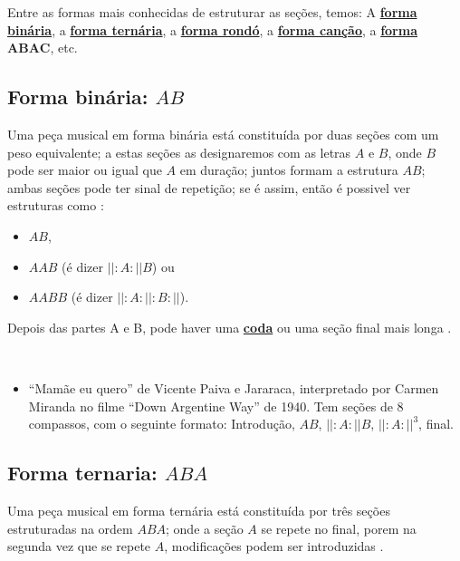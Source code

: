 Entre as formas mais conhecidas de estruturar as seções, temos:
A \hyperref[subsec:formabinaria]{\textbf{forma binária}}, 
a \hyperref[subsec:formaternaria]{\textbf{forma ternária}}, 
a \hyperref[subsec:formarondo]{\textbf{forma rondó}}, 
a \hyperref[subsec:formacancao]{\textbf{forma canção}}, 
a \hyperref[subsec:formaabac]{\textbf{forma $\mathbf{ABAC}$}}, 
etc.
 



\subsection{Forma binária: $AB$}
\label{subsec:formabinaria}
Uma peça musical em forma binária está constituída por duas seções 
com um peso equivalente; 
a estas seções as designaremos com as letras $A$ e $B$, 
onde $B$ pode ser maior ou igual que $A$ em duração; juntos
formam a estrutura $AB$;
ambas seções pode ter sinal de repetição; se é assim, então é possivel ver estruturas como 
\cite[pp. 71]{bennett1993elementos} \cite[pp. 93]{copland1974ouvir}:
\begin{itemize}
\item $AB$,
\item $AAB$ (é dizer $||:A:||B$) ou 
\item $AABB$ (é dizer $||:A:||:B:||$).
\end{itemize}
Depois das partes A e B, 
pode haver uma \hyperref[ref:Coda]{\textbf{coda}} 
ou uma seção final mais longa \cite[pp. 86-87]{holland2013music}.

\begin{example} ~
\begin{itemize}
\item ``Mamãe eu quero'' de Vicente Paiva e Jararaca,
interpretado por Carmen Miranda no filme ``Down Argentine Way'' de 1940. 
Tem seções de 8 compassos,
com o seguinte formato:
Introdução, $AB$, $||:A:||B$, $||:A:||^3$, final.
\end{itemize}
\end{example}




\subsection{Forma ternaria: $ABA$}
\label{subsec:formaternaria}
Uma peça musical em forma ternária está constituída por três seções 
estruturadas na ordem $ABA$; 
onde a seção $A$ se repete no final,
porem na segunda vez que se repete $A$,
modificações podem ser introduzidas \cite[pp. 71]{bennett1993elementos} \cite[pp. 88]{holland2013music}.


